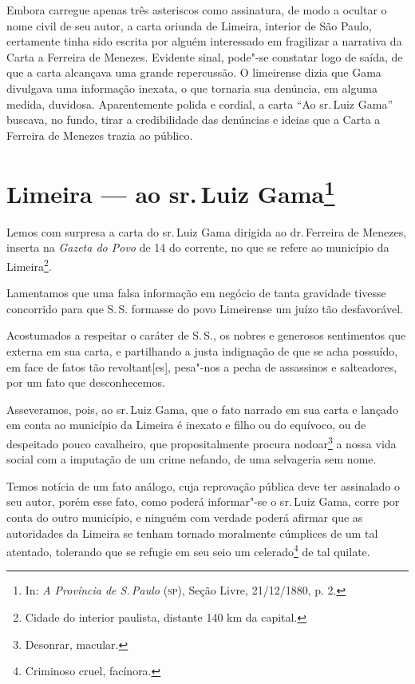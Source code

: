 {\small\noindent
Embora carregue apenas três asteriscos como assinatura, de modo a
ocultar o nome civil de seu autor, a carta oriunda de Limeira, interior
de São Paulo, certamente tinha sido escrita por alguém interessado em
fragilizar a narrativa da Carta a Ferreira de Menezes. Evidente sinal,
pode"-se constatar logo de saída, de que a carta alcançava uma grande
repercussão. O limeirense dizia que Gama divulgava uma informação
inexata, o que tornaria sua denúncia, em alguma medida, duvidosa.
Aparentemente polida e cordial, a carta ``Ao sr.\,Luiz Gama'' buscava, no
fundo, tirar a credibilidade das denúncias e ideias que a Carta a
Ferreira de Menezes trazia ao público. }

\chapter{Limeira --- ao sr.\,Luiz Gama\footnote[*]{In: \emph{A Província de S.\,Paulo} (\textsc{sp}), Seção Livre, 21/12/1880, p. 2.}}


Lemos com surpresa a carta do sr.\,Luiz Gama dirigida ao dr.\,Ferreira de
Menezes, inserta na \emph{Gazeta do Povo} de 14 do corrente, no que se
refere ao município da Limeira\footnote{Cidade do interior paulista,
  distante 140 km da capital.}.

Lamentamos que uma falsa informação em negócio de tanta gravidade
tivesse concorrido para que S.\,S. formasse do povo Limeirense um juízo
tão desfavorável.

Acostumados a respeitar o caráter de S.\,S., os nobres e generosos
sentimentos que externa em sua carta, e partilhando a justa indignação
de que se acha possuído, em face de fatos tão revoltant{[}es{]},
pesa"-nos a pecha de assassinos e salteadores, por um fato que
desconhecemos.

Asseveramos, pois, ao sr.\,Luiz Gama, que o fato narrado em sua carta e
lançado em conta ao município da Limeira é inexato e filho ou do
equívoco, ou de despeitado pouco cavalheiro, que propositalmente procura
nodoar\footnote{Desonrar, macular.} a nossa vida social com a
imputação de um crime nefando, de uma selvageria sem nome.

Temos notícia de um fato análogo, cuja reprovação pública deve ter
assinalado o seu autor, porém esse fato, como poderá informar"-se o sr.\,Luiz Gama, corre por conta do outro município, e ninguém com verdade
poderá afirmar que as autoridades da Limeira se tenham tornado
moralmente cúmplices de um tal atentado, tolerando que se refugie em seu
seio um celerado\footnote{Criminoso cruel, facínora.} de tal quilate.

